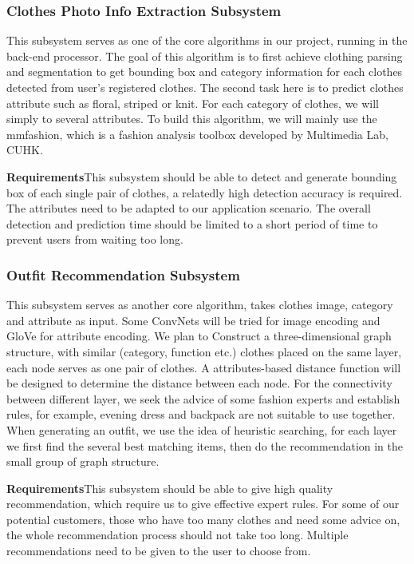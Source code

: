 \subsubsection{Clothes Photo Info Extraction Subsystem}
\setlength{\parindent}{2em}This subsystem serves as one of the core algorithms in our project, running in the back-end processor. The goal of this algorithm is to first achieve clothing parsing and segmentation to get bounding box and category information for each clothes detected from user’s registered clothes. The second task here is to predict clothes attribute such as floral, striped or knit. For each category of clothes, we will simply to several attributes. To build this algorithm, we will mainly use the mmfashion\cite{mmfashion}, which is a fashion analysis toolbox developed by Multimedia Lab, CUHK. 

\noindent\textbf{Requirements}\quad This subsystem should be able to detect and generate bounding box of each single pair of clothes, a relatedly high detection accuracy is required. The attributes need to be adapted to our application scenario. The overall detection and prediction time should be limited to a short period of time to prevent users from waiting too long.

\subsubsection{Outfit Recommendation Subsystem}
\setlength{\parindent}{2em}This subsystem serves as another core algorithm, takes clothes image, category and attribute as input. Some ConvNets will be tried for image encoding and GloVe for attribute encoding\cite{7890387}. We plan to Construct a three-dimensional graph structure, with similar (category, function etc.) clothes placed on the same layer, each node serves as one pair of clothes. A attributes-based distance function will be designed to determine the distance between each node. For the connectivity between different layer, we seek the advice of some fashion experts and establish rules, for example, evening dress and backpack are not suitable to use together. When generating an outfit, we use the idea of heuristic searching, for each layer we first find the several best matching items, then do the recommendation in the small group of graph structure. 

\noindent\textbf{Requirements}\quad This subsystem should be able to give high quality recommendation, which require us to give effective expert rules. For some of our potential customers, those who have too many clothes and need some advice on, the whole recommendation process should not take too long. Multiple recommendations need to be given to the user to choose from.

